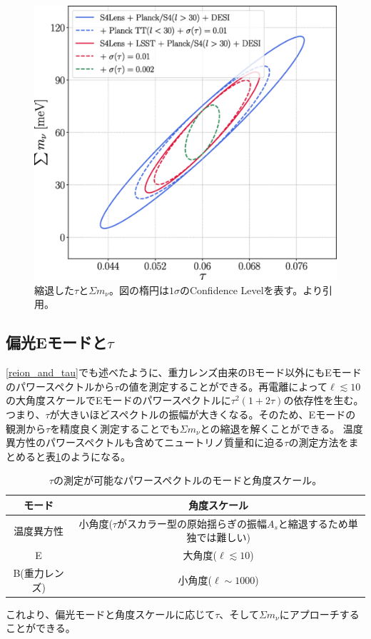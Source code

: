 \begin{figure}[htbp]
  \centering
  \includegraphics[width=0.8\columnwidth]{2_cosmology/figs/medium.png}
  \caption{縮退した$\tau$と$\Sigma m_{\nu}$。図の楕円は$1\sigma$のConfidence Levelを表す。\cite{degeneracy}より引用。}
  \label{degeneracy}
\end{figure}

\subsection{偏光Eモードと$\tau$}
\label{E_and_tau}
\ref{reion_and_tau}でも述べたように、重力レンズ由来のBモード以外にもEモードのパワースペクトルから$\tau$の値を測定することができる。再電離によって$\ell\lesssim 10$の大角度スケールでEモードのパワースペクトルに$\tau^{2}(1+2\tau)$の依存性を生む。つまり、$\tau$が大きいほどスペクトルの振幅が大きくなる。そのため、Eモードの観測から$\tau$を精度良く測定することでも$\Sigma m_{\nu}$との縮退を解くことができる。
温度異方性のパワースペクトルも含めてニュートリノ質量和に迫る$\tau$の測定方法をまとめると表\ref{tau_methods}のようになる。
\begin{table}[htbp]
  \centering
  \caption{$\tau$の測定が可能なパワースペクトルのモードと角度スケール。}
  \vspace{3mm}
  \begin{tabular}{cc} \hline
    モード & 角度スケール  \\ \hline
    温度異方性 & 小角度($\tau$がスカラー型の原始揺らぎの振幅$A_{s}$と縮退するため単独では難しい) \\
    E & 大角度($\ell\lesssim 10$) \\
    B(重力レンズ) & 小角度($\ell\sim 1000$) \\ \hline
  \end{tabular}
  \label{tau_methods}
\end{table}
これより、偏光モードと角度スケールに応じて$\tau$、そして$\Sigma m_{\nu}$にアプローチすることができる。

